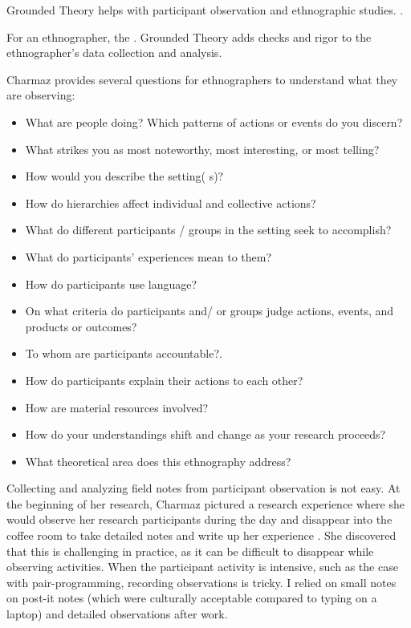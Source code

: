 Grounded Theory helps with participant observation and ethnographic studies.  \cite{Charmaz}.

For an ethnographer, the  \cite{Charmaz}. Grounded Theory adds checks and rigor to the ethnographer's data collection and analysis. 

Charmaz provides several questions for ethnographers to understand what they are observing:
\begin{itemize}
\item What are people doing? Which patterns of actions or events do you discern?
\item What strikes you as most noteworthy, most interesting, or most telling?
\item How would you describe the setting( s)?
\item How do hierarchies affect individual and collective actions?
\item What do different participants / groups in the setting seek to accomplish?
\item What do participants' experiences mean to them?
\item How do participants use language?
\item On what criteria do participants and/ or groups judge actions, events, and products or outcomes?
\item To whom are participants accountable?.
\item How do participants explain their actions to each other?
\item How are material resources involved?
\item How do your understandings shift and change as your research proceeds?
\item What theoretical area does this ethnography address? \cite{Charmaz}
\end{itemize}

Collecting and analyzing field notes from participant observation is not easy. At the beginning of her research, Charmaz pictured a research experience where she would observe her research participants during the day and disappear into the coffee room to take detailed notes and write up her experience \cite{Charmaz}. She discovered that this is challenging in practice, as it can be difficult to disappear while observing activities. When the participant activity is intensive, such as the case with pair-programming, recording observations is tricky. I relied on small notes on post-it notes (which were culturally acceptable compared to typing on a laptop) and detailed observations after work.

